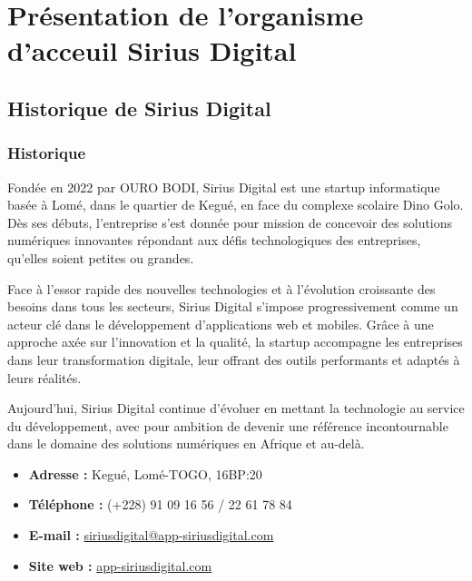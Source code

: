 \chapter{Présentation de l'organisme d'acceuil Sirius Digital}
\clearpage
\section{Historique de Sirius Digital}

\subsection{Historique}

Fondée en 2022 par OURO BODI, Sirius Digital est une startup informatique basée à Lomé, dans le quartier de Kegué, en face du complexe scolaire Dino Golo. Dès ses débuts, l’entreprise s’est donnée pour mission de concevoir des solutions numériques innovantes répondant aux défis technologiques des entreprises, qu'elles soient petites ou grandes.

Face à l'\ac{essor} rapide des nouvelles technologies et à l’évolution croissante des besoins dans tous les secteurs, Sirius Digital s’impose progressivement comme un acteur clé dans le développement d’applications web et mobiles. Grâce à une approche axée sur l’innovation et la qualité, la startup accompagne les entreprises dans leur transformation digitale, leur offrant des outils performants et adaptés à leurs réalités.

Aujourd’hui, Sirius Digital continue d’évoluer en mettant la technologie au service du développement, avec pour ambition de devenir une référence incontournable dans le domaine des solutions numériques en Afrique et au-delà.


\begin{itemize}
    \item \textbf{Adresse :} Kegué, Lomé-TOGO, 16BP:20
    \item \textbf{Téléphone :} (+228) 91 09 16 56 / 22 61 78 84
    \item \textbf{E-mail :} \href{mailto:siriusdigital@app-siriusdigital.com}{siriusdigital@app-siriusdigital.com}
    \item \textbf{Site web :} \href{https://app-siriusdigital.com}{app-siriusdigital.com}
\end{itemize}



